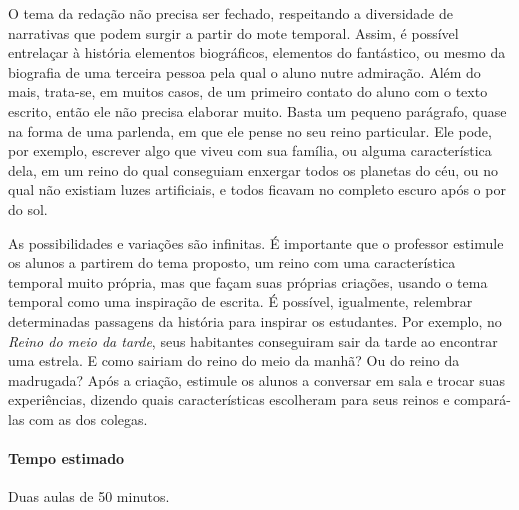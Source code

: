 \documentclass[11pt]{extarticle}
\begin{document}
O tema da redação não precisa ser fechado, respeitando a diversidade de narrativas que podem surgir a partir do mote temporal. Assim, é possível entrelaçar à história elementos biográficos, elementos do fantástico, ou mesmo da biografia de uma terceira pessoa pela qual o aluno nutre admiração. Além do mais, trata-se, em muitos casos, de um primeiro contato do aluno com o texto escrito, então ele não precisa elaborar muito. Basta um pequeno parágrafo, quase na forma de uma parlenda, em que ele pense no seu reino particular. Ele pode, por exemplo, escrever algo que viveu com sua família, ou alguma característica dela, em um reino do qual conseguiam enxergar todos os planetas do céu, ou no qual não existiam luzes artificiais, e todos ficavam no completo escuro após o por do sol.

As possibilidades e variações são infinitas. É importante que o professor estimule os alunos a partirem do tema proposto, um reino com uma característica temporal muito própria, mas que façam suas próprias criações, usando o tema temporal como uma inspiração de escrita. É possível, igualmente, relembrar determinadas passagens da história para inspirar os estudantes. Por exemplo, no \textit{Reino do meio da tarde}, seus habitantes conseguiram sair da tarde ao encontrar uma estrela. E como sairiam do reino do meio da manhã? Ou do reino da madrugada? Após a criação, estimule os alunos a conversar em sala e trocar suas experiências, dizendo quais características escolheram para seus reinos e compará-las com as dos colegas.

\paragraph{Tempo estimado} Duas aulas de 50 minutos.
\end{document}
